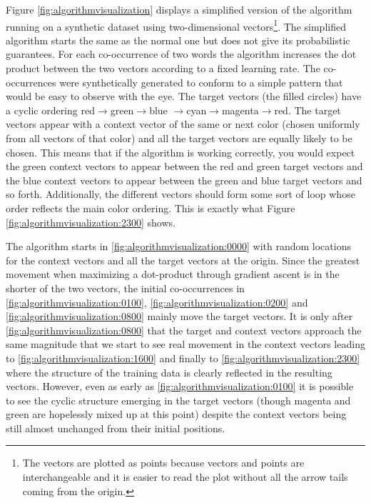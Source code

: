 Figure \ref{fig:algorithmvisualization} displays a simplified version of the 
\modelname{} algorithm running on a synthetic dataset using two-dimensional 
vectors\footnote{The vectors are plotted as points because vectors and points
are interchangeable and it is easier to read the plot without all the arrow 
tails coming from the origin.}. The simplified algorithm
starts the same as the normal one but does not give its probabilistic 
guarantees. For each co-occurrence of two words the algorithm increases the dot
product between the two vectors according to a fixed learning rate. The 
co-occurrences were synthetically generated to conform to a simple pattern
that would be easy to observe with the eye. The target vectors (the filled
circles) have a cyclic ordering red$\rightarrow$green$\rightarrow$blue%
$\rightarrow$cyan$\rightarrow$magenta$\rightarrow$red. The target vectors appear
with a context vector of the same or next color (chosen uniformly from all
vectors of that color) and all the target vectors are equally likely to be 
chosen. This means that if the algorithm is working correctly, you would expect
the green context vectors to appear between the red and green target vectors and
the blue context vectors to appear between the green and blue target vectors and
so forth. Additionally, the different vectors should form some sort of loop
whose order reflects the main color ordering. This is exactly what Figure 
\ref{fig:algorithmvisualization:2300} shows.

The algorithm starts in \ref{fig:algorithmvisualization:0000} with random 
locations for the context vectors and all the target vectors at the origin. 
Since the greatest movement when maximizing a dot-product through gradient 
ascent is in the shorter of the two vectors, the initial co-occurrences in 
\ref{fig:algorithmvisualization:0100}, \ref{fig:algorithmvisualization:0200}
and \ref{fig:algorithmvisualization:0800} mainly move the target vectors. It is
only after \ref{fig:algorithmvisualization:0800} that the target and context
vectors approach the same magnitude that we start to see real movement in the
context vectors leading to \ref{fig:algorithmvisualization:1600} and finally
to \ref{fig:algorithmvisualization:2300} where the structure of the training 
data is clearly reflected in the resulting vectors. However, even as early
as \ref{fig:algorithmvisualization:0100} it is possible to see the cyclic 
structure emerging in the target vectors (though magenta and green are 
hopelessly mixed up at this point) despite the context vectors being still 
almost unchanged from their initial positions.

